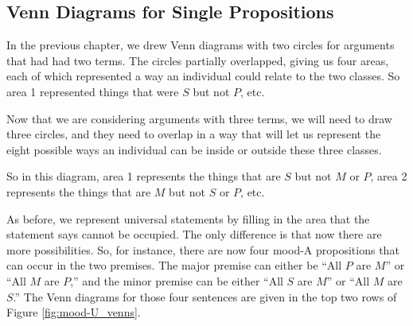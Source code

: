 \subsection{Venn Diagrams for Single Propositions}
In the previous chapter, we drew Venn diagrams with two circles for arguments that had had two terms. The circles partially overlapped, giving us four areas, each of which represented a way an individual could relate to the two classes. So area 1 represented things that were $S$ but not $P$, etc. 

\begin{center}
\end{center}

Now that we are considering arguments with three terms, we will need to draw three circles, and they need to overlap in a way that will let us represent the eight possible ways an individual can be inside or outside these three classes.

\begin{center}
\label{fig:three_term_venn_areas}
\end{center}

So in this diagram, area 1 represents the things that are $S$ but not $M$ or $P$, area 2 represents the things that are $M$ but not $S$ or $P$, etc. 

As before, we represent universal statements by filling in the area that the statement says cannot be occupied. The only difference is that now there are more possibilities. So, for instance, there are now four mood-A propositions that can occur in the two premises. The major premise can either be ``All $P$ are $M$'' or ``All $M$ are $P$,'' and the minor premise can be either ``All $S$ are $M$'' or ``All $M$ are $S$.'' The Venn diagrams for those four sentences are given in the top two rows of Figure \ref{fig:mood-U_venns}.

